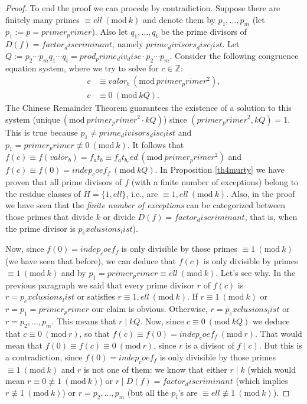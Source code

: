 \documentclass[a4paper, 12pt]{article}
\theoremstyle{definition}
\theoremstyle{remark}
\newcommand{\Z}{\ensuremath{\mathbb{Z}}}
\newcommand{\Mod}[1]{\ (\mathrm{mod}\ #1)} %
\begin{document}
\begin{proof}
To end the proof we can procede by contradiction. Suppose there are finitely many primes $\equiv {ell}\Mod{{k}}$ and denote them by $p_1,\dots,p_m$ (let $p_1:=p={primer_primer}$). Also let $q_1,\dots,q_t$ be the prime divisors of $D(f)={factor_discriminant}$, namely ${prime_divisors_disc_list}$. Let $Q:=p_2\cdots p_mq_1\cdots q_t={prod_prime_div_disc}\cdot p_2\cdots p_m$. Consider the following congruence equation system, where we try to solve for $c\in\Z$:
	\begin{align*}
		c&\equiv {valor_b}\Mod{{primer_primer}^2},\\
		c&\equiv 0\Mod{{k}Q}.
	\end{align*}
	The Chinese Remainder Theorem guarantees the existence of a solution to this system (unique$\Mod{{primer_primer}^2\cdot{k}Q}$) since $({primer_primer}^2,{k}Q)=1$. This is true because $p_1\neq{prime_divisors_disc_list}$ and $p_1={primer_primer}\not\equiv 0 \Mod{{k}}$. It follows that $f(c)\equiv f({valor_b})={f_at_b}\equiv {f_at_b_red} \Mod{{primer_primer}^2}$ and $f(c)\equiv f(0)={indep_coef_f}\Mod{{k}Q}$. In Proposition \ref{th4murty} we have proven that all prime divisors of $f$ (with a finite number of exceptions) belong to the residue classes of $H=\{1, {ell}\}$, i.e., are $\equiv1, {ell}\Mod{{k}}$. Also, in the proof we have seen that the \textit{finite number of exceptions} can be categorized between those primes that divide ${k}$ or divide $D(f)={factor_discriminant}$, that is, when the prime divisor is ${p_exclusions_list}$).
	
	Now, since $f(0)={indep_coef_f}$ is only divisible by those primes $\equiv 1\Mod{{k}}$ (we have seen that before), we can deduce that $f(c)$ is only divisible by primes $\equiv 1\Mod{{k}}$ and by $p_1={primer_primer}\equiv {ell}\Mod{{k}}$. Let's see why. In the previous paragraph we said that every prime divisor $r$ of $f(c)$ is $r={p_exclusions_list}$ or satisfies $r\equiv 1,{ell}\Mod{{k}}$. If $r\equiv 1\Mod{{k}}$ or $r=p_1={primer_primer}$ our claim is obvious. Otherwise, $r={p_exclusions_list}$ or $r=p_2,\dots,p_m$. This means that $r\mid {k}Q$. Now, since $c\equiv 0\Mod{{k}Q}$ we deduce that $c\equiv 0\Mod{r}$, so that $f(c)\equiv f(0)={indep_coef_f}\Mod{r}$. That would mean that $f(0)\equiv f(c)\equiv 0\Mod{r}$, since $r$ is a divisor of $f(c)$. But this is a contradiction, since $f(0)={indep_coef_f}$ is only divisible by those primes $\equiv 1\Mod{{k}}$ and $r$ is not one of them: we know that either $r\mid {k}$ (which would mean $r\equiv 0\not\equiv 1\Mod{{k}}$) or $r\mid D(f)={factor_discriminant}$ (which implies $r\not\equiv 1\Mod{{k}}$) or $r=p_2,\dots,p_m$ (but all the $p_i$'s are $\equiv{ell} \not\equiv 1\Mod{{k}}$).
    

\end{proof}
\end{document}
